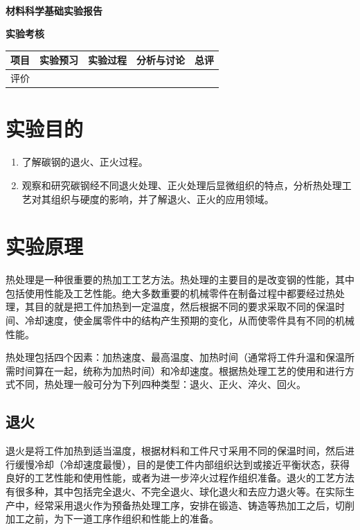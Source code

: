 \documentclass[a4paper,utf8]{article}
\begin{document}
\begin{center}
    {\mbox{}\\[7em]\bfseries\songti%
    材料科学基础实验报告}\\[34mm]
    {\bfseries\songti
    实验考核\\[3mm]
    \extrarowheight=3mm
    \begin{tabularx}{150mm}{|X|X|X|X|X|}\hline
        \hfil 项目 \hfil  & \hfil 实验预习 \hfil & \hfil 实验过程 \hfil & \hfil 分析与讨论 \hfil & \hfil 总评 \hfil \\[3mm] \hline
        \hfil 评价 \hfil &  &  &  &  \\[3mm] \hline
    \end{tabularx}
    }
\end{center}\newpage
\section{实验目的}
    \begin{enumerate}
        \item 了解碳钢的退火、正火过程。
        \item 观察和研究碳钢经不同退火处理、正火处理后显微组织的特点，分析热处理工艺对其组织与硬度的影响，并了解退火、正火的应用领域。
    \end{enumerate}
\section{实验原理}%
    热处理是一种很重要的热加工工艺方法。热处理的主要目的是改变钢的性能，其中包括使用性能及工艺性能。绝大多数重要的机械零件在制备过程中都要经过热处理，其目的就是把工件加热到一定温度，然后根据不同的要求采取不同的保温时间、冷却速度，使金属零件中的结构产生预期的变化，从而使零件具有不同的机械性能。\par
    热处理包括四个因素：加热速度、最高温度、加热时间（通常将工件升温和保温所需时间算在一起，统称为加热时间）和冷却速度。根据热处理工艺的使用和进行方式不同，热处理一般可分为下列四种类型：退火、正火、淬火、回火。\par
    \subsection{退火}
        退火是将工件加热到适当温度，根据材料和工件尺寸采用不同的保温时间，然后进行缓慢冷却（冷却速度最慢），目的是使工件内部组织达到或接近平衡状态，获得良好的工艺性能和使用性能，或者为进一步淬火过程作组织准备。退火的工艺方法有很多种，其中包括完全退火、不完全退火、球化退火和去应力退火等。在实际生产中，经常采用退火作为预备热处理工序，安排在锻造、铸造等热加工之后，切削加工之前，为下一道工序作组织和性能上的准备。
\end{document}
